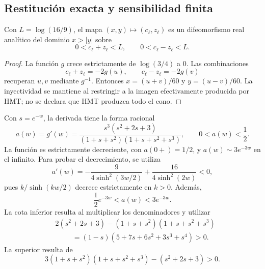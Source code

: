 \subsection{Restitución exacta y sensibilidad finita}
\label{md:comp:restitucion}

\begin{proposition}
\label{md:comp:prop-restitucion}
Con \(L=\log(16/9)\), el mapa
\((x,y)\longmapsto(c_\ell,z_\ell)\) es un difeomorfismo real analítico
del dominio \(x>|y|\) sobre
\begin{equation}
 0<c_\ell+z_\ell<L,\qquad 0<c_\ell-z_\ell<L.
 \label{md:comp:imagen-logaritmica}
\end{equation}
\end{proposition}
\begin{proof}
La función \(g\) crece estrictamente de \(\log(3/4)\) a \(0\).
Las combinaciones
\[
 c_\ell+z_\ell=-2g(u),\qquad c_\ell-z_\ell=-2g(v)
\]
recuperan \(u,v\) mediante \(g^{-1}\). Entonces
\(x=(u+v)/60\) y \(y=(u-v)/60\).
La inyectividad se mantiene al restringir a la imagen efectivamente
producida por HMT; no se declara que HMT produzca todo el cono.
\end{proof}

Con \(s=e^{-w}\), la derivada tiene la forma racional
\begin{equation}
 a(w)=g'(w)=
 \frac{s^3(s^2+2s+3)}{(1+s+s^2)(1+s+s^2+s^3)},
 \qquad 0<a(w)<\frac12.
 \label{md:comp:derivada-racional}
\end{equation}
La función es estrictamente decreciente, con \(a(0+)=1/2\), y
\(a(w)\sim3e^{-3w}\) en el infinito. Para probar el decrecimiento,
se utiliza
\begin{equation}
 a'(w)=-\frac{9}{4\sinh^2(3w/2)}
        +\frac{16}{4\sinh^2(2w)}<0,
 \label{md:comp:decrecimiento}
\end{equation}
pues \(k/\sinh(kw/2)\) decrece estrictamente en \(k>0\).
Además,
\begin{equation}
 \frac12e^{-3w}<a(w)<3e^{-3w}.
 \label{md:comp:cotas-exponenciales}
\end{equation}
La cota inferior resulta al multiplicar los denominadores y utilizar
\begin{equation}
 \begin{split}
 &2(s^2+2s+3)-(1+s+s^2)(1+s+s^2+s^3)\\
 &\hspace{1cm}=(1-s)(5+7s+6s^2+3s^3+s^4)>0.
 \end{split}
 \label{md:comp:polinomio-cota}
\end{equation}
La superior resulta de
\[
 3(1+s+s^2)(1+s+s^2+s^3)-(s^2+2s+3)>0.
\]

